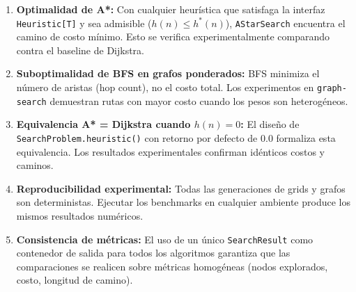 \begin{enumerate}
    \item \textbf{Optimalidad de A*:} Con cualquier heurística que satisfaga la interfaz \texttt{Heuristic[T]} y sea admisible ($h(n) \leq h^*(n)$), \texttt{AStarSearch} encuentra el camino de costo mínimo. Esto se verifica experimentalmente comparando contra el baseline de Dijkstra.

    \item \textbf{Suboptimalidad de BFS en grafos ponderados:} BFS minimiza el número de aristas (hop count), no el costo total. Los experimentos en \texttt{graph-search} demuestran rutas con mayor costo cuando los pesos son heterogéneos.

    \item \textbf{Equivalencia A* = Dijkstra cuando $h(n) = 0$:} El diseño de \texttt{SearchProblem.heuristic()} con retorno por defecto de 0.0 formaliza esta equivalencia. Los resultados experimentales confirman idénticos costos y caminos.

    \item \textbf{Reproducibilidad experimental:} Todas las generaciones de grids y grafos son deterministas. Ejecutar los benchmarks en cualquier ambiente produce los mismos resultados numéricos.

    \item \textbf{Consistencia de métricas:} El uso de un único \texttt{SearchResult} como contenedor de salida para todos los algoritmos garantiza que las comparaciones se realicen sobre métricas homogéneas (nodos explorados, costo, longitud de camino).
\end{enumerate}
